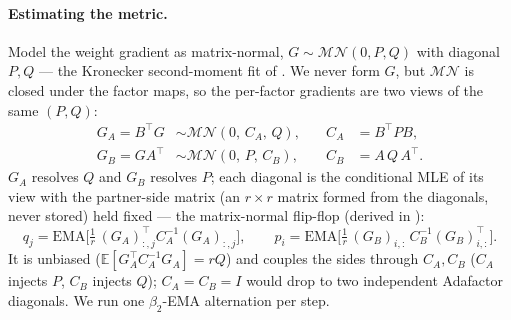 \documentclass[11pt]{article}
\newcommand{\E}{\mathbb{E}}
\theoremstyle{plain}
\theoremstyle{definition}
\theoremstyle{remark}
\begin{document}
\paragraph{Estimating the metric.}
\label{par:coupling}
Model the weight gradient as matrix-normal, $G\sim\mathcal{MN}(0,P,Q)$ with diagonal $P,Q$ --- the Kronecker second-moment fit of \cite{klshampoo,soap}. We never form $G$, but $\mathcal{MN}$ is closed under the factor maps, so the per-factor gradients are two views of the same $(P,Q)$:
\begin{equation}
\begin{aligned}
  G_A=B^\top G &\sim\mathcal{MN}(0,\,C_A,\,Q), &\quad C_A&=B^\top P B,\\
  G_B=GA^\top  &\sim\mathcal{MN}(0,\,P,\,C_B), &\quad C_B&=A\,Q\,A^\top .
\end{aligned}
\label{eq:ours-closure}
\end{equation}
$G_A$ resolves $Q$ and $G_B$ resolves $P$; each diagonal is the conditional MLE of its view with the partner-side matrix (an $r\times r$ matrix formed from the diagonals, never stored) held fixed --- the matrix-normal flip-flop \cite{klshampoo,dutilleul} (derived in ):
\begin{equation}
  q_j=\mathrm{EMA}\Big[\tfrac1r\,(G_A)_{:,j}^\top C_A^{-1}(G_A)_{:,j}\Big],\qquad
  p_i=\mathrm{EMA}\Big[\tfrac1r\,(G_B)_{i,:}\,C_B^{-1}(G_B)_{i,:}^\top\Big].
  \label{eq:ours-klcoupling}
\end{equation}
It is unbiased ($\E[G_A^\top C_A^{-1}G_A]=rQ$) and couples the sides through $C_A,C_B$ ($C_A$ injects $P$, $C_B$ injects $Q$); $C_A=C_B=I$ would drop to two independent Adafactor diagonals. We run one $\beta_2$-EMA alternation per step.
\end{document}
